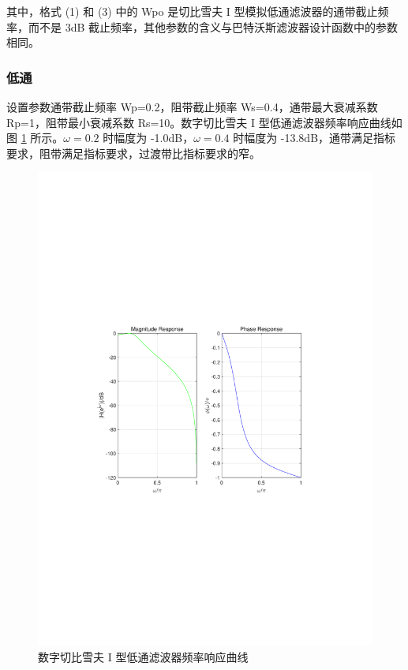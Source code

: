 \documentclass[12pt,AutoFakeBold]{article}
\begin{document}
其中，格式 (1) 和 (3) 中的 Wpo 是切比雪夫 I 型模拟低通滤波器的通带截止频率，而不是 3dB 截止频率，其他参数的含义与巴特沃斯滤波器设计函数中的参数相同。

\subsubsection{低通}

设置参数通带截止频率 Wp=0.2，阻带截止频率 Ws=0.4，通带最大衰减系数 Rp=1，阻带最小衰减系数 Rs=10。数字切比雪夫 I 型低通滤波器频率响应曲线如图 \ref{fig:LPC1F} 所示。$\omega=0.2$ 时幅度为 -1.0dB，$\omega=0.4$ 时幅度为 -13.8dB，通带满足指标要求，阻带满足指标要求，过渡带比指标要求的窄。

\begin{figure}[hbtp]
	\centering
	\includegraphics[width=14cm]{figure/LPC1F.pdf}
	\caption{数字切比雪夫 I 型低通滤波器频率响应曲线} \label{fig:LPC1F}
\end{figure}
\end{document}
